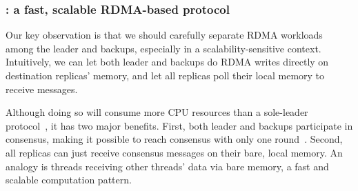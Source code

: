 \vspace{-.15in}\subsubsection{\falcon: a fast, scalable RDMA-based \paxos 
protocol} 
\label{sec:falcon}\vspace{-.075in}

Our key observation is that we should carefully separate RDMA workloads among
the leader and backups, especially in a scalability-sensitive context. 
Intuitively, we can let both leader and backups do RDMA writes directly on 
destination replicas' memory, and let all replicas poll their local memory to 
receive messages.

Although doing so will consume more CPU resources than a sole-leader 
protocol~\cite{dare:hpdc15}, it has two major benefits. First, both leader and 
backups participate in consensus, making it possible to reach consensus 
with only one round~\cite{paxos:practical}. Second, all replicas can just 
receive consensus messages on their bare, local memory. An analogy is threads 
receiving other threads' data via bare memory, a fast and scalable computation 
pattern.




